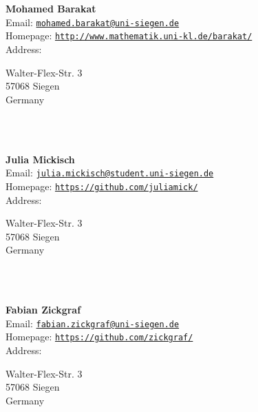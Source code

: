 \documentclass[a4paper,11pt]{report}
\newcommand{\logpage}[1]{\protect\write\pagenrlog{#1, \thepage,}}
\begin{document}
\begin{titlepage}
\mbox{}\\
{\mbox{}\\
\small \noindent \textbf{ Mohamed Barakat\\
    }  Email: \href{mailto://mohamed.barakat@uni-siegen.de} {\texttt{mohamed.barakat@uni-siegen.de}}\\
  Homepage: \href{http://www.mathematik.uni-kl.de/~barakat/} {\texttt{http://www.mathematik.uni-kl.de/\texttt{}barakat/}}\\
  Address: \begin{minipage}[t]{8cm}\noindent
 Walter-Flex-Str. 3\\
 57068 Siegen\\
 Germany\\
 \end{minipage}
}\\
{\mbox{}\\
\small \noindent \textbf{ Julia Mickisch\\
    }  Email: \href{mailto://julia.mickisch@student.uni-siegen.de} {\texttt{julia.mickisch@student.uni-siegen.de}}\\
  Homepage: \href{https://github.com/juliamick/} {\texttt{https://github.com/juliamick/}}\\
  Address: \begin{minipage}[t]{8cm}\noindent
 Walter-Flex-Str. 3\\
 57068 Siegen\\
 Germany\\
 \end{minipage}
}\\
{\mbox{}\\
\small \noindent \textbf{ Fabian Zickgraf\\
    }  Email: \href{mailto://fabian.zickgraf@uni-siegen.de} {\texttt{fabian.zickgraf@uni-siegen.de}}\\
  Homepage: \href{https://github.com/zickgraf/} {\texttt{https://github.com/zickgraf/}}\\
  Address: \begin{minipage}[t]{8cm}\noindent
 Walter-Flex-Str. 3\\
 57068 Siegen\\
 Germany\\
 \end{minipage}
}\\
\end{titlepage}

\newpage\setcounter{page}{2}
\newpage

\def\contentsname{Contents\logpage{[ 0, 0, 1 ]}}
\end{document}
